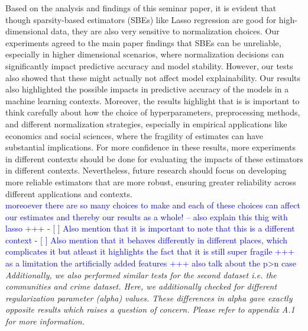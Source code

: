 Based on the analysis and findings of this seminar paper, it is evident that though sparsity-based estimators (SBEs) like Lasso regression are good for high-dimensional data, they are also very sensitive to normalization choices. Our experiments agreed to the main paper findings that SBEs can be unreliable, especially in higher dimensional scenarios, where normalization decisions can significantly impact predictive accuracy and model stability. However, our tests also showed that these might actually not affect model explainability. Our results also highlighted the possible impacts in predictive accuracy of the models in a machine learning contexts. Moreover, the results highlight that is is important to think carefully about how the choice of hyperparameters, preprocessing methods, and different normalization strategies, especially in empirical applications like economics and social sciences, where the fragility of estimates can have substantial implications.  For more confidence in these results, more experiments in different contexts should be done for evaluating the impacts of these estimators in different contexts. Nevertheless, future research should focus on developing more reliable estimators that are more robust, ensuring greater reliability across different applications and contexts.\\

\textcolor{blue}{moreoever there are so many choices to make and each of these choices can affect our estimates and thereby our results as a whole! -- also explain this thig with lasso +++ - [ ] Also mention that it is important to note that this is a different context 
- [ ] Also mention that it behaves differently in different places, which complicates it but atleast it highlights the fact that it is still super fragile
+++ as a limitation the artificially added features
+++ also talk about the p>n case}
\textit{Additionally, we also performed similar tests for the second dataset i.e. the communities and crime dataset. Here, we additionally checked for different regularization parameter (alpha) values. These differences in alpha gave exactly opposite results which raises a question of concern. Please refer to appendix A.1 for more information. }
 
